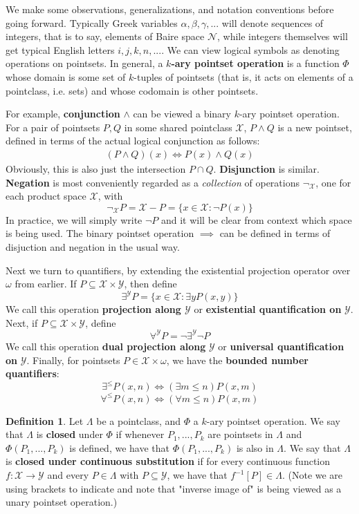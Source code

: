 \documentclass{article}
\theoremstyle{definition}
\newtheorem{definition}{Definition}[section]
\theoremstyle{plain}
\begin{document}
We make some observations, generalizations, and notation conventions before going forward. Typically Greek variables $\alpha, \beta, \gamma,...$ will denote sequences of integers, that is to say, elements of Baire space $\mathcal{N}$, while integers themselves will get typical English letters $i,j,k,n,...$. We can view logical symbols as denoting operations on pointsets. In general, a \textbf{$k$-ary pointset operation} is a function $\Phi$ whose domain is some set of $k$-tuples of pointsets (that is, it acts on elements of a pointclass, i.e. sets) and whose codomain is other pointsets. 
\par For example, \textbf{conjunction} $\wedge$ can be viewed a binary $k$-ary pointset operation. For a pair of pointsets $P,Q$ in some shared pointclass $\mathcal{X}$, $P \wedge Q$ is a new pointset, defined in terms of the actual logical conjunction as follows:
\begin{align}
	(P \wedge Q)(x) \iff P(x) \wedge Q(x) 
\end{align}
Obviously, this is also just the intersection $P \cap Q$. \textbf{Disjunction} is similar. \textbf{Negation} is most conveniently regarded as a \textit{collection} of operations $\neg_{\mathcal{X}}$, one for each product space $\mathcal{X}$, with 
\[ \neg_{\mathcal{X}}P = \mathcal{X} - P = \{ x \in \mathcal{X}: \neg P(x) \} \]
In practice, we will simply write $\neg P$ and it will be clear from context which space is being used. The binary pointset operation $\implies$ can be defined in terms of disjuction and negation in the usual way.
\par Next we turn to quantifiers, by extending the existential projection operator over $\omega$ from earlier. If $P \subseteq \mathcal{X} \times \mathcal{Y}$, then define
\[ \exists^{\mathcal{Y}}P = \{x \in \mathcal{X}: \exists y P(x,y)\} \]
We call this operation \textbf{projection along $\mathcal{Y}$} or \textbf{existential quantification on} $\mathcal{Y}$. Next, if $P \subseteq \mathcal{X} \times \mathcal{Y}$, define 
\[ \forall^{\mathcal{Y}}P = \neg \exists^{\mathcal{Y}} \neg P \]
We call this operation \textbf{dual projection along} $\mathcal{Y}$ or \textbf{universal quantification on} $\mathcal{Y}$. Finally, for pointsets $P \in \mathcal{X} \times \omega$, we have the \textbf{bounded number quantifiers}: 
\[ \exists^{\leq}P(x,n) \iff (\exists m \leq n)P(x,m) \]
\[ \forall^{\leq}P(x,n) \iff (\forall m \leq n)P(x,m) \]

\begin{definition}
	Let $\Lambda$ be a pointclass, and $\Phi$ a $k$-ary pointset operation. We say that $\Lambda$ is \textbf{closed} under $\Phi$ if whenever $P_1,...,P_k$ are pointsets in $\Lambda$ and $\Phi(P_1,...,P_k)$ is defined, we have that $\Phi(P_1,...,P_k)$ is also in $\Lambda$. We say that $\Lambda$ is \textbf{closed under continuous substitution} if for every continuous function $f:\mathcal{X} \to \mathcal{Y}$ and every $P \in \Lambda$ with $P \subseteq \mathcal{Y}$, we have that $f^{-1}[P] \in \Lambda$. (Note we are using brackets to indicate and note that "inverse image of" is being viewed as a unary pointset operation.)   
\end{definition}
\end{document}
